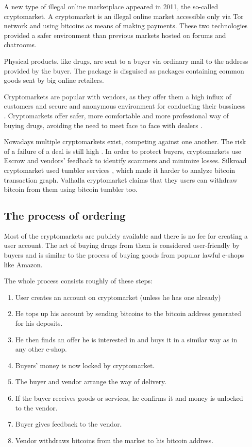 \documentclass[
  digital, %
  table,   %
  lof,     %
  lot,     %
  oneside
]{fithesis3}
\begin{document}
A new type of illegal online marketplace appeared in 2011, the so-called cryptomarket. 
A cryptomarket is an illegal online market accessible only via Tor network and using bitcoins
as means of making payments. These two technologies provided a safer environment
than previous markets hosted on forums and chatrooms.

Physical products, like drugs, are sent to a buyer via ordinary mail to the address provided by the buyer.
The package is disguised as packages containing common goods sent by big online retailers.
\parencite{paquet2017cryptomarkets}

Cryptomarkets are popular with vendors,
as they offer them a high influx of customers and secure and anonymous environment for conducting their bussiness \parencite{van2014responsible}.
Cryptomarkets offer safer, more comfortable and more professional way of buying drugs, avoiding 
the need to meet face to face with dealers \parencite{barratt2014use}.

Nowadays multiple cryptomarkets exist, competing against one another. The risk
of a failure of a deal is still high \parencite{wehinger2011dark}.
In order to protect buyers, cryptomarkets use Escrow and vendors' feedback to identify scammers and minimize losses.
Silkroad cryptomarket used tumbler services \parencite{ron2014did},
which made it harder to analyze bitcoin transaction graph. Valhalla cryptomarket claims that they
users can withdraw bitcoin from them using bitcoin tumbler too.

\subsection{The process of ordering}
Most of the cryptomarkets are publicly available and there is no fee
for creating a user account. The act of buying drugs from them is considered user-friendly by buyers and is similar
to the process of buying goods from popular lawful e-shops like Amazon.

 The whole process consists roughly of these steps:
\begin{enumerate}
\item User creates an account on cryptomarket (unless he has one already)
\item He tops up his account by sending bitcoins to the bitcoin address generated for his deposits.
\item He then finds an offer he is interested in and buys it in a similar way as in any other e-shop.
\item Buyers' money is now locked by cryptomarket.
\item The buyer and vendor arrange the way of delivery.
\item If the buyer receives goods or services, he confirms it and money is unlocked to the vendor.
\item Buyer gives feedback to the vendor. 
\item Vendor withdraws bitcoins from the market to his bitcoin address.
\end{enumerate}
\end{document}
